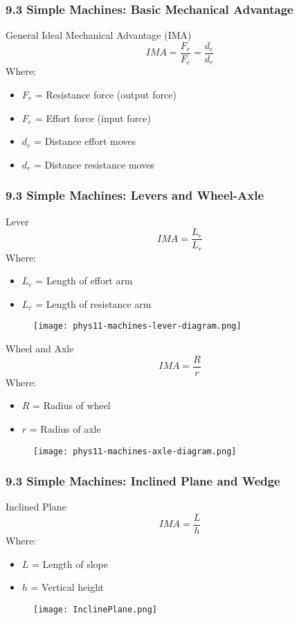 \documentclass{beamer}
\begin{document}
\begin{frame}
\frametitle{9.3 Simple Machines: Basic Mechanical Advantage}
\begin{block}{General Ideal Mechanical Advantage (IMA)}
$$IMA = \frac{F_r}{F_e} = \frac{d_e}{d_r}$$
Where:
\begin{itemize}
\item $F_r$ = Resistance force (output force)
\item $F_e$ = Effort force (input force)
\item $d_e$ = Distance effort moves
\item $d_r$ = Distance resistance moves
\end{itemize}
\end{block}
\end{frame}

\begin{frame}
\frametitle{9.3 Simple Machines: Levers and Wheel-Axle}
\begin{block}{Lever}
$$IMA = \frac{L_e}{L_r}$$
Where:
\begin{itemize}
\item $L_e$ = Length of effort arm
\item $L_r$ = Length of resistance arm
\end{itemize}
\end{block}

\begin{figure}
    \centering
    \texttt{[image: phys11-machines-lever-diagram.png]}
\end{figure}
\end{frame}

\begin{frame}
\begin{block}{Wheel and Axle}
$$IMA = \frac{R}{r}$$
Where:
\begin{itemize}
\item $R$ = Radius of wheel
\item $r$ = Radius of axle
\end{itemize}
\end{block}
\begin{figure}
    \centering
    \texttt{[image: phys11-machines-axle-diagram.png]}
\end{figure}
\end{frame}

\begin{frame}
\frametitle{9.3 Simple Machines: Inclined Plane and Wedge}
\begin{block}{Inclined Plane}
$$IMA = \frac{L}{h}$$
Where:
\begin{itemize}
\item $L$ = Length of slope
\item $h$ = Vertical height
\end{itemize}
\end{block}
\begin{figure}
    \centering
    \texttt{[image: InclinePlane.png]}
\end{figure}

\end{frame}
\end{document}
